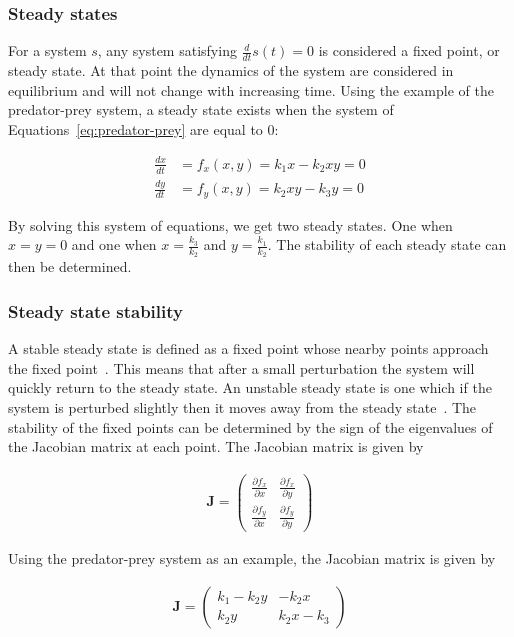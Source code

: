 \subsubsection{Steady states}

For a system $s$, any system satisfying $\frac{d}{dt}s(t) = 0$ is considered a fixed point, or steady state. At that point the dynamics of the system are considered in equilibrium and will not change with increasing time. Using the example of the predator-prey system, a steady state exists when the system of Equations~\ref{eq:predator-prey} are equal to 0: 
 
\begin{align}
\frac{dx}{dt} &= f_x(x,y) = k_{1}x - k_{2}xy = 0\\
\frac{dy}{dt} &= f_y(x,y) = k_{2}xy - k_{3}y = 0
\end{align}

By solving this system of equations, we get two steady states. One when $x = y = 0$ and one when $x = \frac{k_3}{k_2}$ and $y = \frac{k_1}{k_2}$. The stability of each steady state can then be determined.

\subsubsection{Steady state stability} 

A stable steady state is defined as a fixed point whose nearby points approach the fixed point~\autocite{kaplan:1959}. This means that after a small perturbation the system will quickly return to the steady state. An unstable steady state is one which if the system is perturbed slightly then it moves away from the steady state~\autocite{konopka:2007}. The stability of the fixed points can be determined by the sign of the eigenvalues of the Jacobian matrix at each point. The Jacobian matrix is given by 

\begin{align}
\textbf{J} = \begin{pmatrix}
	\frac{\partial f_x}{\partial x} & \frac{\partial f_x}{\partial y}\\
	\frac{\partial f_y}{\partial x} & \frac{\partial f_y}{\partial y}	
\end{pmatrix}
\end{align}


\noindent Using the predator-prey system as an example, the Jacobian matrix is given by

\begin{align}
\textbf{J} = \begin{pmatrix}
	k_1 - k_{2}y & -k_{2}x\\
	k_{2}y & k_{2}x - k_3 
\end{pmatrix}
\end{align}


